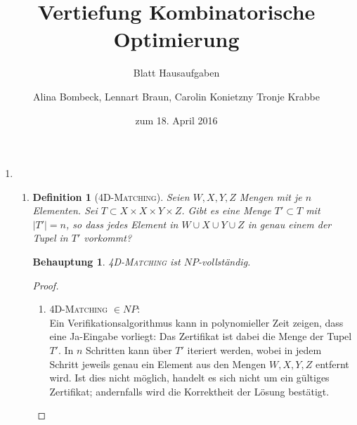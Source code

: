 \documentclass[a4paper]{scrartcl}
\title{Vertiefung Kombinatorische Optimierung}
\subtitle{Blatt {\blattnr} Hausaufgaben}
\author{%
    Alina Bombeck,
    Lennart Braun,
    Carolin Konietzny
    Tronje Krabbe
}
\date{zum 18. April 2016}
\newtheorem*{proposition}{Behauptung}
\newtheorem*{definition}{Definition}
\begin{document}
\maketitle


\begin{enumerate}[label=\bfseries \arabic*.]
\item %
\begin{enumerate}
\item
    \begin{definition}[\textsc{4D-Matching}]
        Seien $W,X,Y,Z$ Mengen mit je $n$ Elementen.
        Sei $T \subset X \times X \times Y \times Z$.
        Gibt es eine Menge $T' \subset T$ mit $|T'| = n$, so dass jedes Element
        in $W \cup X \cup Y \cup Z$ in genau einem der Tupel in $T'$ vorkommt?
    \end{definition}
    \begin{proposition}
        \textsc{4D-Matching} ist $NP$-vollständig.
    \end{proposition}
    \begin{proof}
        \hfill \\
        \begin{enumerate}
            \item \textsc{4D-Matching} $\in NP$: \\
                Ein Verifikationsalgorithmus kann in polynomieller Zeit zeigen,
                dass eine Ja-Eingabe vorliegt: Das Zertifikat ist dabei die
                Menge der Tupel $T'$. In $n$ Schritten kann über $T'$ iteriert
                werden, wobei in jedem Schritt jeweils genau ein Element aus
                den Mengen $W,X,Y,Z$ entfernt wird. Ist dies nicht möglich,
                handelt es sich nicht um ein gültiges Zertifikat; andernfalls
                wird die Korrektheit der Lösung bestätigt.


\end{enumerate}
\end{proof}
\end{enumerate}
\end{enumerate}
\end{document}
